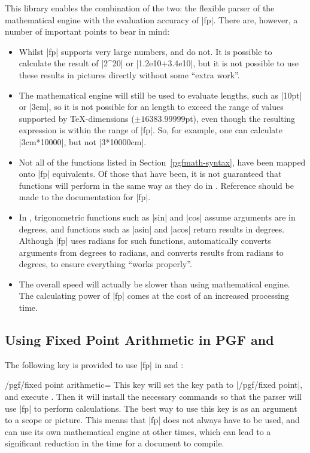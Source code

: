 This library enables the combination of the two: the flexible parser of the
\pgfname{} mathematical engine with the evaluation accuracy of |fp|. There are,
however, a number of important points to bear in mind:
%
\begin{itemize}
    \item Whilst |fp| supports very large numbers, \pgfname{} and \tikzname{}
        do not. It is possible to calculate the result of |2^20| or
        |1.2e10+3.4e10|, but it is not possible to use these results in
        pictures directly without some ``extra work''.
    \item The \pgfname{} mathematical engine will still be used to evaluate
        lengths, such as |10pt| or |3em|, so it is not possible for an length
        to exceed the range of values supported by \TeX-dimensions
        ($\pm16383.99999$pt), even though the resulting expression is within
        the range of |fp|. So, for example, one can calculate |3cm*10000|, but
        not |3*10000cm|.
    \item Not all of the functions listed in Section~\ref{pgfmath-syntax}, have
        been mapped onto |fp| equivalents. Of those that have been, it is not
        guaranteed that functions will perform in the same way as they do in
        \pgfname. Reference should be made to the documentation for |fp|.
    \item In \pgfname, trigonometric functions such as |sin| and |cos| assume
        arguments are in degrees, and functions such as |asin| and |acos|
        return results in degrees. Although |fp| uses radians for such
        functions, \pgfname{} automatically converts arguments from degrees to
        radians, and converts results from radians to degrees, to ensure
        everything ``works properly''.
    \item The overall speed will actually be slower than using \pgfname{}
        mathematical engine. The calculating power of |fp| comes at the cost of
        an increased processing time.
\end{itemize}


\subsection{Using Fixed Point Arithmetic in PGF and \tikzname}

The following key is provided to use |fp| in \pgfname{} and \tikzname:

\begin{key}{/pgf/fixed point arithmetic=}
    This key will set the key path to |/pgf/fixed point|, and execute
    . Then it will install the necessary commands so that the
    \pgfname{} parser will use |fp| to perform calculations. The best way to
    use this key is as an argument to a scope or picture. This means that |fp|
    does not always have to be used, and \pgfname{} can use its own
    mathematical engine at other times, which can lead to a significant
    reduction in the time for a document to compile.
\end{key}

